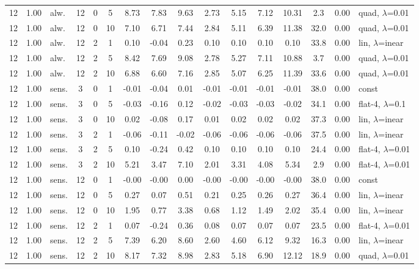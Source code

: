 \begin{scriptsize}
\begin{longtable}{cclcc c ccc ccc c cc l}
12 & 1.00 & alw. & 12 & 0 & 5 & 8.73 & 7.83 & 9.63 & 2.73 & 5.15 & 7.12 & 10.31 & 2.3 & 0.00 & quad, $\lambda$=0.01 \\
12 & 1.00 & alw. & 12 & 0 & 10 & 7.10 & 6.71 & 7.44 & 2.84 & 5.11 & 6.39 & 11.38 & 32.0 & 0.00 & quad, $\lambda$=0.01 \\
12 & 1.00 & alw. & 12 & 2 & 1 & 0.10 & -0.04 & 0.23 & 0.10 & 0.10 & 0.10 & 0.10 & 33.8 & 0.00 & lin, $\lambda$=inear \\
12 & 1.00 & alw. & 12 & 2 & 5 & 8.42 & 7.69 & 9.08 & 2.78 & 5.27 & 7.11 & 10.88 & 3.7 & 0.00 & quad, $\lambda$=0.01 \\
12 & 1.00 & alw. & 12 & 2 & 10 & 6.88 & 6.60 & 7.16 & 2.85 & 5.07 & 6.25 & 11.39 & 33.6 & 0.00 & quad, $\lambda$=0.01 \\
12 & 1.00 & sens. & 3 & 0 & 1 & -0.01 & -0.04 & 0.01 & -0.01 & -0.01 & -0.01 & -0.01 & 38.0 & 0.00 & const \\
12 & 1.00 & sens. & 3 & 0 & 5 & -0.03 & -0.16 & 0.12 & -0.02 & -0.03 & -0.03 & -0.02 & 34.1 & 0.00 & flat-4, $\lambda$=0.1 \\
12 & 1.00 & sens. & 3 & 0 & 10 & 0.02 & -0.08 & 0.17 & 0.01 & 0.02 & 0.02 & 0.02 & 37.3 & 0.00 & lin, $\lambda$=inear \\
12 & 1.00 & sens. & 3 & 2 & 1 & -0.06 & -0.11 & -0.02 & -0.06 & -0.06 & -0.06 & -0.06 & 37.5 & 0.00 & lin, $\lambda$=inear \\
12 & 1.00 & sens. & 3 & 2 & 5 & 0.10 & -0.24 & 0.42 & 0.10 & 0.10 & 0.10 & 0.10 & 24.4 & 0.00 & flat-4, $\lambda$=0.01 \\
12 & 1.00 & sens. & 3 & 2 & 10 & 5.21 & 3.47 & 7.10 & 2.01 & 3.31 & 4.08 & 5.34 & 2.9 & 0.00 & flat-4, $\lambda$=0.01 \\
12 & 1.00 & sens. & 12 & 0 & 1 & -0.00 & -0.00 & 0.00 & -0.00 & -0.00 & -0.00 & -0.00 & 38.0 & 0.00 & const \\
12 & 1.00 & sens. & 12 & 0 & 5 & 0.27 & 0.07 & 0.51 & 0.21 & 0.25 & 0.26 & 0.27 & 36.4 & 0.00 & lin, $\lambda$=inear \\
12 & 1.00 & sens. & 12 & 0 & 10 & 1.95 & 0.77 & 3.38 & 0.68 & 1.12 & 1.49 & 2.02 & 35.4 & 0.00 & lin, $\lambda$=inear \\
12 & 1.00 & sens. & 12 & 2 & 1 & 0.07 & -0.24 & 0.36 & 0.08 & 0.07 & 0.07 & 0.07 & 23.5 & 0.00 & flat-4, $\lambda$=0.01 \\
12 & 1.00 & sens. & 12 & 2 & 5 & 7.39 & 6.20 & 8.60 & 2.60 & 4.60 & 6.12 & 9.32 & 16.3 & 0.00 & lin, $\lambda$=inear \\
12 & 1.00 & sens. & 12 & 2 & 10 & 8.17 & 7.32 & 8.98 & 2.83 & 5.18 & 6.90 & 12.12 & 18.9 & 0.00 & quad, $\lambda$=0.01 \\
\end{longtable}
\end{scriptsize}